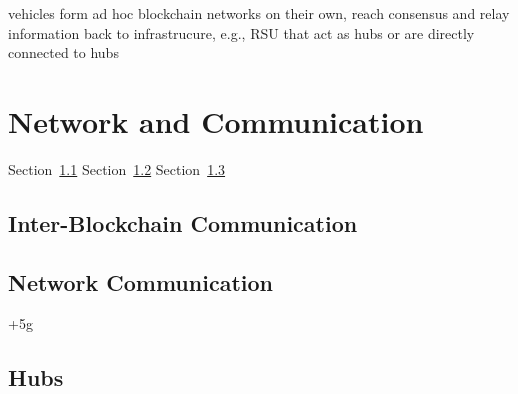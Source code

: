 \documentclass{llncs}
\begin{document}
{			vehicles form ad hoc blockchain networks on their own, reach consensus and relay information back to infrastrucure, e.g., RSU that act as hubs or are directly connected to hubs
		
				
	
	
	
	\section{Network and Communication}
		\label{s:section-4}	


		Section~\ref{ss:inter-blockchain-communication}
		Section~\ref{ss:network-communication}		
		Section~\ref{ss:blockchain-hubs}		
		
		
		\subsection{Inter-Blockchain Communication}
			\label{ss:inter-blockchain-communication}
			

		\subsection{Network Communication}
			\label{ss:network-communication}
		
			+5g

		\subsection{Hubs}
			\label{ss:blockchain-hubs}
		


}
\end{document}
